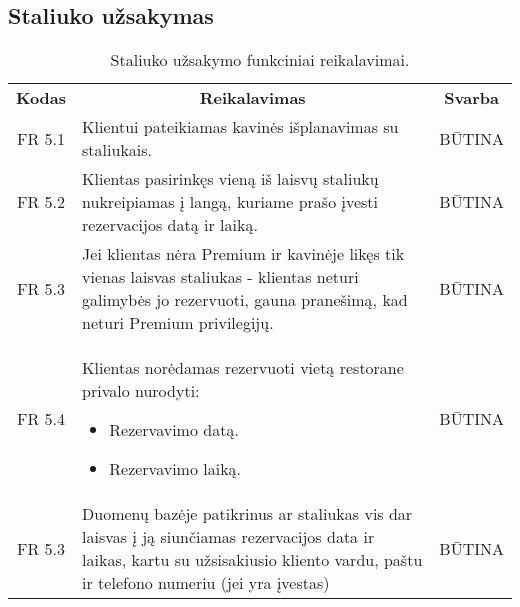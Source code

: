 \documentclass{VUMIFPSkursinis}
\begin{document}
\pagebreak


\subsection{Staliuko užsakymas}
\begin{center}
	\begin{table}[H]
	\begin{tabular}{|p{2cm}|p{}|p{}|}
	
	\hline
	    \rowcolor{lightgray}
		\multicolumn{3}{|c|}{Staliuko užsakymas}\\
		
	\hline
		\multicolumn{1}{|c|}{{\bfseries Kodas}}&
		\multicolumn{1}{|c|}{{\bfseries Reikalavimas}}&
		\multicolumn{1}{|c|}{{\bfseries Svarba}}\\

	\hline
	
		\multicolumn{1}{|c|}{FR 5.1}&
		{Klientui pateikiamas kavinės išplanavimas su staliukais.}&
		\multicolumn{1}{|c|}{BŪTINA}\\				
	\hline
	
		\multicolumn{1}{|c|}{FR 5.2}&
		{Klientas pasirinkęs vieną iš laisvų staliukų nukreipiamas į langą, kuriame prašo įvesti rezervacijos datą ir laiką.}&
		\multicolumn{1}{|c|}{BŪTINA}\\				
	\hline
	
		\multicolumn{1}{|c|}{FR 5.3}&
		{Jei klientas nėra Premium ir kavinėje likęs tik vienas laisvas staliukas - klientas neturi galimybės jo rezervuoti, gauna pranešimą, kad neturi Premium privilegijų.}&
		\multicolumn{1}{|c|}{BŪTINA}\\				
	\hline
	
		\multicolumn{1}{|c|}{FR 5.4}&
		{Klientas norėdamas rezervuoti vietą restorane privalo nurodyti:
			\begin{itemize}
				\item Rezervavimo datą.
				\item Rezervavimo laiką.
			\end{itemize}}&
			\multicolumn{1}{|c|}{BŪTINA}\\				
	\hline
	
		\multicolumn{1}{|c|}{FR 5.3}&
		{Duomenų bazėje patikrinus ar staliukas vis dar laisvas į ją siunčiamas rezervacijos data ir laikas, kartu su užsisakiusio kliento vardu, paštu ir telefono numeriu (jei yra įvestas)}&
		\multicolumn{1}{|c|}{BŪTINA}\\				
	\hline
	
			
	
	\end{tabular}		
	\caption{Staliuko užsakymo funkciniai reikalavimai.}
	\label{table:StaliukoUžsakymas}
	\end{table}


\end{center}
\end{document}
